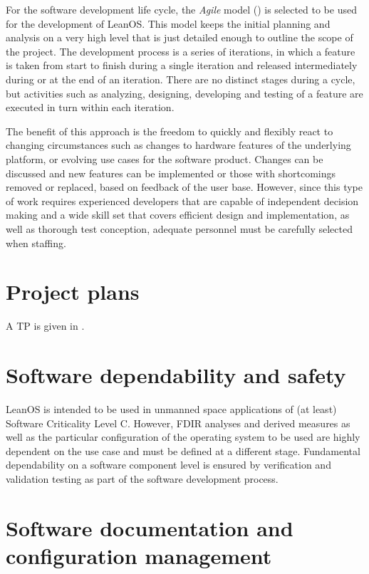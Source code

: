\noindent
For the software development life cycle, the \emph{Agile} model ()
is selected to be used for the development of LeanOS.
This model keeps the initial planning and analysis on a very high level that
is just detailed enough to outline the scope of the project. The development
process is a series of iterations, in which a feature is taken from start to
finish during a single iteration and released intermediately during or at the
end of an iteration.
There are no distinct stages during a cycle, but activities
such as analyzing, designing, developing and testing of a feature are executed
in turn within each iteration.

The benefit of this approach is the freedom to quickly and flexibly react to
changing circumstances such as changes to hardware features of the underlying
platform, or evolving use cases for the software product. Changes can be
discussed and new features can be implemented or those with shortcomings removed
or replaced, based on feedback of the user base.
However, since this type of
work requires experienced developers that are capable of independent decision
making and a wide skill set that covers efficient design and implementation, as
well as thorough test conception, adequate personnel must be carefully selected
when staffing.



\section{Project plans}

A \glsdesc{TP} is given in \cite{leanosTP}.


\section{Software dependability and safety}

LeanOS is intended to be used in unmanned space
applications of (at least) Software Criticality Level C. However, \gls{FDIR}
analyses and derived measures as well as the particular configuration of
the operating system to be used are highly dependent on the use case and must
be defined at a different stage. Fundamental dependability on a software
component level is ensured by verification and validation testing as part of the
software development process.


\section{Software documentation and configuration management}

